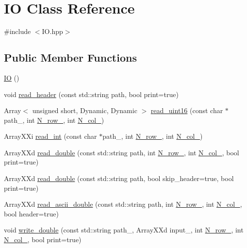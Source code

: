 \hypertarget{class_i_o}{}\section{IO Class Reference}
\label{class_i_o}


{\ttfamily \#include $<$I\+O.\+hpp$>$}

\subsection*{Public Member Functions}
\begin{DoxyCompactItemize}
\item 
\hyperlink{class_i_o_a49b27a2ee79bce0de4e3ef163cbebd30}{IO} ()
\item 
void \hyperlink{class_i_o_aed76c50d1122060292bfb10181edc990}{read\+\_\+header} (const std\+::string path, bool print=true)
\item 
Array$<$ unsigned short, Dynamic, Dynamic $>$ \hyperlink{class_i_o_a0ba1550dc3c2b6fd4675bc03408b8d95}{read\+\_\+uint16} (const char $\ast$path\+\_\+, int \hyperlink{class_i_o_ab8aa1490df2e2e758766030afdae3a40}{N\+\_\+row\+\_\+}, int \hyperlink{class_i_o_a64aae2d2be35348233f8ddac4d6791f2}{N\+\_\+col\+\_\+})
\item 
Array\+X\+Xi \hyperlink{class_i_o_a7b78b5f726c5299423e72b2b44bce0c9}{read\+\_\+int} (const char $\ast$path\+\_\+, int \hyperlink{class_i_o_ab8aa1490df2e2e758766030afdae3a40}{N\+\_\+row\+\_\+}, int \hyperlink{class_i_o_a64aae2d2be35348233f8ddac4d6791f2}{N\+\_\+col\+\_\+})
\item 
Array\+X\+Xd \hyperlink{class_i_o_aa2d53b758b98c564688d00ca5236744e}{read\+\_\+double} (const std\+::string path, int \hyperlink{class_i_o_ab8aa1490df2e2e758766030afdae3a40}{N\+\_\+row\+\_\+}, int \hyperlink{class_i_o_a64aae2d2be35348233f8ddac4d6791f2}{N\+\_\+col\+\_\+}, bool print=true)
\item 
Array\+X\+Xd \hyperlink{class_i_o_a34ed8843269915cb0b4eb8719da3535d}{read\+\_\+double} (const std\+::string path, bool skip\+\_\+header=true, bool print=true)
\item 
Array\+X\+Xd \hyperlink{class_i_o_a3ddd4b5d95a8a5cfffb56cfcf7c186e1}{read\+\_\+ascii\+\_\+double} (const std\+::string path, int \hyperlink{class_i_o_ab8aa1490df2e2e758766030afdae3a40}{N\+\_\+row\+\_\+}, int \hyperlink{class_i_o_a64aae2d2be35348233f8ddac4d6791f2}{N\+\_\+col\+\_\+}, bool header=true)
\item 
void \hyperlink{class_i_o_a9a648215dc5e33abe2c5a8916fff06d4}{write\+\_\+double} (const std\+::string path\+\_\+, Array\+X\+Xd input\+\_\+, int \hyperlink{class_i_o_ab8aa1490df2e2e758766030afdae3a40}{N\+\_\+row\+\_\+}, int \hyperlink{class_i_o_a64aae2d2be35348233f8ddac4d6791f2}{N\+\_\+col\+\_\+}, bool print=true)

\end{DoxyCompactItemize}
